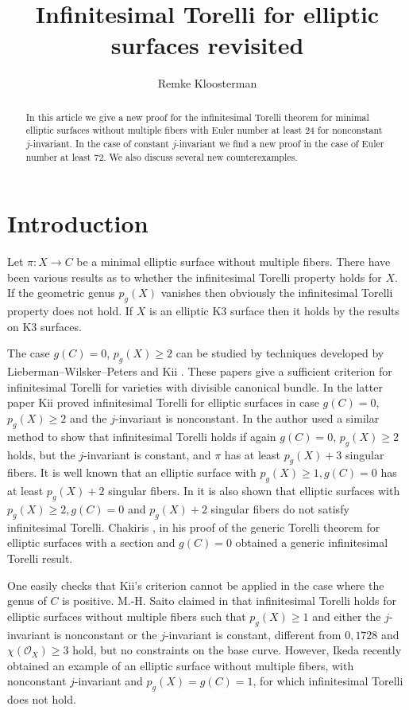 \documentclass{amsart}
\title{Infinitesimal Torelli for elliptic surfaces revisited}
\author{Remke Kloosterman}
\newcommand{\cO}{\mathcal{O}}
\theoremstyle{definition}
\theoremstyle{remark}
\begin{document}
\begin{abstract} 
In this article we give a new proof for the infinitesimal Torelli theorem for minimal elliptic surfaces without multiple fibers with Euler number at least 24 for nonconstant $j$-invariant. In the case of constant $j$-invariant we find a new proof in the case of Euler number at least 72. We also discuss several new counterexamples.
\end{abstract}
\maketitle

\section{Introduction}\label{secIntro}
Let $\pi:X\to C$ be a minimal elliptic surface without multiple fibers. 
There have been various results as to whether the infinitesimal Torelli property holds for $X$. If the geometric genus $p_g(X)$ vanishes then obviously the infinitesimal Torelli property does not hold. If $X$ is an elliptic K3 surface then it holds by the results on K3 surfaces.

The case $g(C)=0$, $p_g(X)\geq 2$ can be studied by techniques developed by Lieberman--Wilsker--Peters \cite{LPW} and Kii \cite{Kii}. These papers give a sufficient criterion for  infinitesimal Torelli for varieties with divisible canonical bundle. In the latter paper Kii proved infinitesimal Torelli for elliptic surfaces in case $g(C)=0$, $p_g(X)\geq 2$ and the $j$-invariant is nonconstant. In \cite{Ext} the author used a similar method to show that infinitesimal Torelli holds if again $g(C)=0$, $p_g(X)\geq 2$ holds, but the $j$-invariant is constant, and $\pi$ has at least $p_g(X)+3$ singular fibers. It is well known that an elliptic surface with $p_g(X)\geq 1, g(C)=0$ has at least $p_g(X)+2$ singular fibers. In \cite{Ext} it is also shown that elliptic surfaces with $p_g(X)\geq 2, g(C)=0$ and $p_g(X)+2$ singular fibers do not satisfy infinitesimal Torelli.
Chakiris \cite{Cha}, in his proof of the generic Torelli theorem for elliptic surfaces with a section and $g(C)=0$ obtained a generic infinitesimal Torelli result.

One easily checks that Kii's criterion cannot be applied in the case where the genus of $C$ is positive.  M.-H. Saito claimed in \cite{Sai} that infinitesimal Torelli holds for elliptic surfaces without multiple fibers such that   
$p_g(X)\geq 1$ and either the $j$-invariant is nonconstant or the $j$-invariant is constant, different from $0,1728$ and $\chi(\cO_X)\geq 3$ hold, but no constraints on the base curve.
However, Ikeda \cite{IkedaTor} recently obtained an example of an elliptic surface without multiple fibers, with nonconstant $j$-invariant and $p_g(X)=g(C)=1$, for which infinitesimal Torelli does not hold. 
\end{document}
